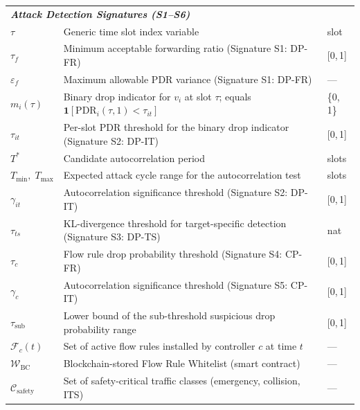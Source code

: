 \documentclass[12pt, a4paper]{report}
\begin{document}
\begin{longtable}{p{2.6cm} p{9.2cm} p{1.9cm}}
\multicolumn{3}{l}{\textit{\textbf{Attack Detection Signatures (S1--S6)}}} \\[2pt]
$\tau$ & Generic time slot index variable & slot \\
$\tau_f$ & Minimum acceptable forwarding ratio (Signature S1: DP-FR) & [0,\,1] \\
$\varepsilon_f$ & Maximum allowable PDR variance (Signature S1: DP-FR) & --- \\
$m_i(\tau)$ & Binary drop indicator for $v_i$ at slot $\tau$; equals $\mathbf{1}[\mathrm{PDR}_i(\tau,1)<\tau_{it}]$ & \{0,\,1\} \\
$\tau_{it}$ & Per-slot PDR threshold for the binary drop indicator (Signature S2: DP-IT) & [0,\,1] \\
$T^*$ & Candidate autocorrelation period & slots \\
$T_\mathrm{min},\;T_\mathrm{max}$ & Expected attack cycle range for the autocorrelation test & slots \\
$\gamma_{it}$ & Autocorrelation significance threshold (Signature S2: DP-IT) & [0,\,1] \\
$\tau_{ts}$ & KL-divergence threshold for target-specific detection (Signature S3: DP-TS) & nat \\
$\tau_c$ & Flow rule drop probability threshold (Signature S4: CP-FR) & [0,\,1] \\
$\gamma_c$ & Autocorrelation significance threshold (Signature S5: CP-IT) & [0,\,1] \\
$\tau_\mathrm{sub}$ & Lower bound of the sub-threshold suspicious drop probability range & [0,\,1] \\
$\mathcal{F}_c(t)$ & Set of active flow rules installed by controller $c$ at time $t$ & --- \\
$\mathcal{W}_\mathrm{BC}$ & Blockchain-stored Flow Rule Whitelist (smart contract) & --- \\
$\mathcal{C}_\mathrm{safety}$ & Set of safety-critical traffic classes (emergency, collision, ITS) & --- \\[6pt]


\end{longtable}
\end{document}

